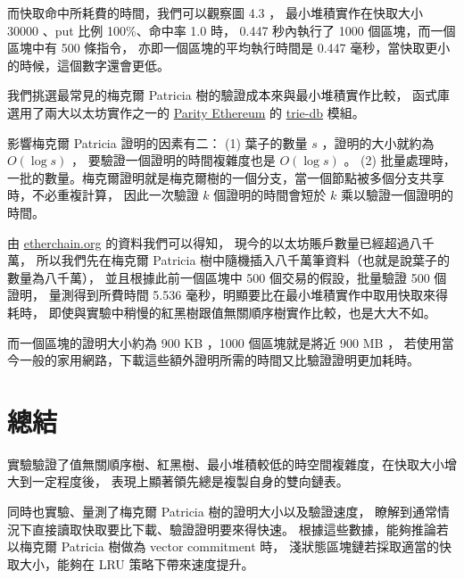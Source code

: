 而快取命中所耗費的時間，我們可以觀察圖 4.3 ，
最小堆積實作在快取大小 30000 、put 比例 100\%、命中率 1.0 時，
 0.447 秒內執行了 1000 個區塊，而一個區塊中有 500 條指令，
亦即一個區塊的平均執行時間是 0.447 毫秒，當快取更小的時候，這個數字還會更低。

我們挑選最常見的梅克爾 Patricia 樹的驗證成本來與最小堆積實作比較，
函式庫選用了兩大以太坊實作之一的 \href{https://www.parity.io/ethereum/}{Parity Ethereum}
的 \href{https://docs.rs/trie-db/0.20.1/trie_db/index.html}{trie-db} 模組。

影響梅克爾 Patricia 證明的因素有二：
(1) 葉子的數量 $s$ ，證明的大小就約為 $O(\log s)$ ， 要驗證一個證明的時間複雜度也是 $O(\log s)$ 。
(2) 批量處理時，一批的數量。梅克爾證明就是梅克爾樹的一個分支，當一個節點被多個分支共享時，不必重複計算，
因此一次驗證 $k$ 個證明的時間會短於 $k$ 乘以驗證一個證明的時間。

由 \href{https://www.etherchain.org/charts/totalAccounts}{etherchain.org} 的資料我們可以得知，
現今的以太坊賬戶數量已經超過八千萬，
所以我們先在梅克爾 Patricia 樹中隨機插入八千萬筆資料（也就是說葉子的數量為八千萬），
並且根據此前一個區塊中 500 個交易的假設，批量驗證 500 個證明，
量測得到所費時間 5.536 毫秒，明顯要比在最小堆積實作中取用快取來得耗時，
即使與實驗中稍慢的紅黑樹跟值無關順序樹實作比較，也是大大不如。

而一個區塊的證明大小約為 900 KB ，1000 個區塊就是將近 900 MB ，
若使用當今一般的家用網路，下載這些額外證明所需的時間又比驗證證明更加耗時。

\section{總結}

實驗驗證了值無關順序樹、紅黑樹、最小堆積較低的時空間複雜度，在快取大小增大到一定程度後，
表現上顯著領先總是複製自身的雙向鏈表。

同時也實驗、量測了梅克爾 Patricia 樹的證明大小以及驗證速度，
瞭解到通常情況下直接讀取快取要比下載、驗證證明要來得快速。
根據這些數據，能夠推論若以梅克爾 Patricia 樹做為 vector commitment 時，
淺狀態區塊鏈若採取適當的快取大小，能夠在 LRU 策略下帶來速度提升。